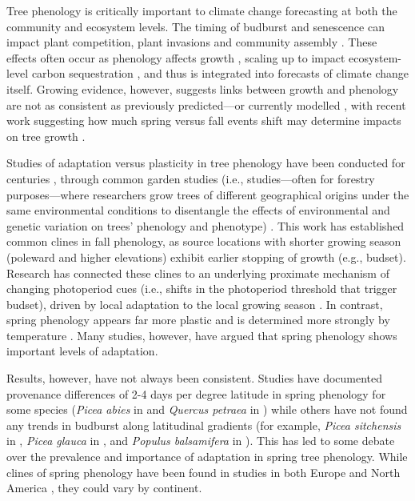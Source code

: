\documentclass{article}
\begin{document}
Tree phenology is critically important to climate change forecasting at both the community and ecosystem levels. The timing of budburst and senescence can impact plant competition, plant invasions and community assembly \citep{fridley12}. These effects often occur as phenology affects growth \citep{myneni97}, scaling up to impact ecosystem-level carbon sequestration \citep{Barichivich12}, and thus is integrated into forecasts of climate change itself. Growing evidence, however, suggests links between growth and phenology are not as consistent as previously predicted---or currently modelled \citep{dow22}, with recent work suggesting how much spring versus fall events shift may determine impacts on tree growth \citep{zohner23}. 

Studies of adaptation versus plasticity in tree phenology have been conducted for centuries \citep{Cleland:2007or}, through common garden studies (i.e., studies---often for forestry purposes---where researchers grow trees of different geographical origins under the same environmental conditions to disentangle the effects of environmental and genetic variation on trees’ phenology and phenotype) \citep{AitkenBemmels16, Alberto13}. This work has established common clines in fall phenology, as source locations with shorter growing season (poleward and higher elevations) exhibit earlier stopping of growth (e.g., budset). Research has connected these clines to an underlying proximate mechanism of changing photoperiod cues (i.e., shifts in the photoperiod threshold that trigger budset), driven by local adaptation to the local growing season \citep{Alberto13,Savolainen07}. In contrast, spring phenology appears far more plastic \citep{AitkenBemmels16} and is determined more strongly by temperature \citep{flynn18}. Many studies, however, have argued that spring phenology shows important levels of adaptation.  %

Results, however, have not always been consistent. Studies have documented provenance differences of 2-4 days per degree latitude in spring phenology for some species (\emph{Picea abies} in \citealp{sog08} and \emph{Quercus petraea} in \citealp{deans96}) while others have not found any trends in budburst along latitudinal gradients (for example, \emph{Picea sitchensis} in \citealp{mimura07}, \emph{Picea glauca} in \citealp{Li97}, and \emph{Populus balsamifera} in \citealp{farmer93}). This has led to some debate over the prevalence and importance of adaptation in spring tree phenology. While clines of spring phenology have been found in studies in both Europe \citep{sog08,deans96,von95} and North America \citep{rossi15, soo13, hannerz99}, they could vary by continent. 
\end{document}
